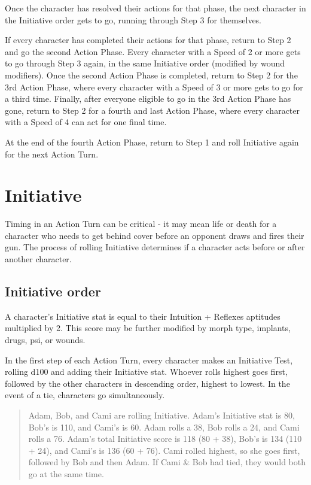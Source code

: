 Once the character has resolved their actions for that phase, the next character in the Initiative order gets to go, running through Step 3 for themselves.

If every character has completed their actions for that phase, return to Step 2 and go the second Action Phase. Every character with a Speed of 2 or more gets to go through Step 3 again, in the same Initiative order (modified by wound modifiers). Once the second Action Phase is completed, return to Step 2 for the 3rd Action Phase, where every character with a Speed of 3 or more gets to go for a third time. Finally, after everyone eligible to go in the 3rd Action Phase has gone, return to Step 2 for a fourth and last Action Phase, where every character with a Speed of 4 can act for one final time.

At the end of the fourth Action Phase, return to Step 1 and roll Initiative again for the next Action Turn.


\section{Initiative}
\label{sec:initiative}

Timing in an Action Turn can be critical - it may mean life or death for a character who needs to get behind cover before an opponent draws and fires their gun. The process of rolling Initiative determines if a character acts before or after another character.


\subsection{Initiative order}
\label{sec:initiative-order}

A character’s Initiative stat is equal to their Intuition + Reflexes aptitudes multiplied by 2. This score may be further modified by morph type, implants, drugs, psi, or wounds.

In the first step of each Action Turn, every character makes an Initiative Test, rolling d100 and adding their Initiative stat. Whoever rolls highest goes first, followed by the other characters in descending order, highest to lowest. In the event of a tie, characters go simultaneously.

\begin{quotation}
Adam, Bob, and Cami are rolling Initiative. Adam’s Initiative stat is 80, Bob’s is 110, and Cami’s is 60. Adam rolls a 38, Bob rolls a 24, and Cami rolls a 76. Adam’s total Initiative score is 118 (80 + 38), Bob’s is 134 (110 + 24), and Cami’s is 136 (60 + 76). Cami rolled highest, so she goes first, followed by Bob and then Adam. If Cami \& Bob had tied, they would both go at the same time.
\end{quotation}


